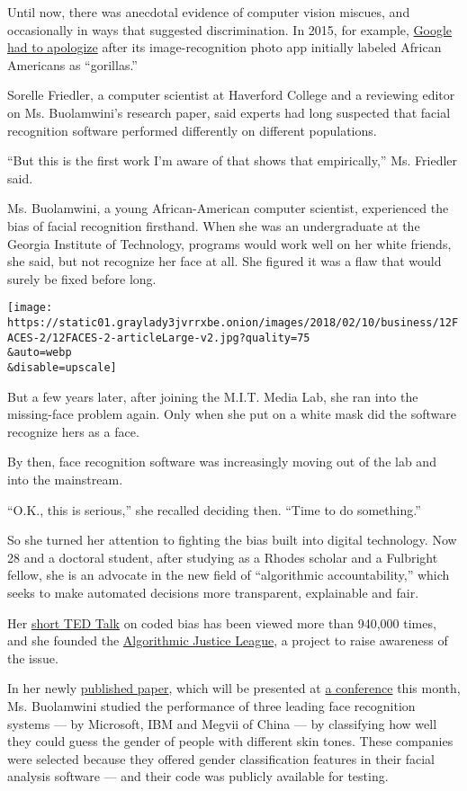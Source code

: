 Until now, there was anecdotal evidence of computer vision miscues, and
occasionally in ways that suggested discrimination. In 2015, for
example,
\href{https://bits.blogs.nytimes3xbfgragh.onion/2015/07/01/google-photos-mistakenly-labels-black-people-gorillas/}{Google
had to apologize} after its image-recognition photo app initially
labeled African Americans as ``gorillas.''

Sorelle Friedler, a computer scientist at Haverford College and a
reviewing editor on Ms. Buolamwini's research paper, said experts had
long suspected that facial recognition software performed differently on
different populations.

``But this is the first work I'm aware of that shows that empirically,''
Ms. Friedler said.

Ms. Buolamwini, a young African-American computer scientist, experienced
the bias of facial recognition firsthand. When she was an undergraduate
at the Georgia Institute of Technology, programs would work well on her
white friends, she said, but not recognize her face at all. She figured
it was a flaw that would surely be fixed before long.

\texttt{[image: https://static01.graylady3jvrrxbe.onion/images/2018/02/10/business/12FACES-2/12FACES-2-articleLarge-v2.jpg?quality=75\\\&auto=webp\\\&disable=upscale]}

But a few years later, after joining the M.I.T. Media Lab, she ran into
the missing-face problem again. Only when she put on a white mask did
the software recognize hers as a face.

By then, face recognition software was increasingly moving out of the
lab and into the mainstream.

``O.K., this is serious,'' she recalled deciding then. ``Time to do
something.''

So she turned her attention to fighting the bias built into digital
technology. Now 28 and a doctoral student, after studying as a Rhodes
scholar and a Fulbright fellow, she is an advocate in the new field of
``algorithmic accountability,'' which seeks to make automated decisions
more transparent, explainable and fair.

Her
\href{https://www.ted.com/talks/joy_buolamwini_how_i_m_fighting_bias_in_algorithms}{short
TED Talk} on coded bias has been viewed more than 940,000 times, and she
founded the \href{https://www.ajlunited.org/}{Algorithmic Justice
League}, a project to raise awareness of the issue.

In her newly
\href{http://proceedings.mlr.press/v81/buolamwini18a/buolamwini18a.pdf}{published
paper}, which will be presented at \href{https://fatconference.org/}{a
conference} this month, Ms. Buolamwini studied the performance of three
leading face recognition systems --- by Microsoft, IBM and Megvii of
China --- by classifying how well they could guess the gender of people
with different skin tones. These companies were selected because they
offered gender classification features in their facial analysis software
--- and their code was publicly available for testing.

